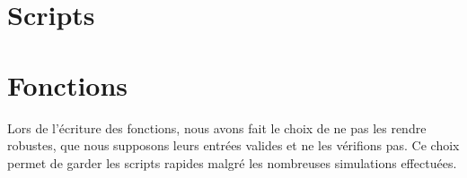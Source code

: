 \documentclass[a4paper, 12pt]{article}
\begin{document}
	\section{Scripts}
	
	
	
	
	
	\newpage
	\section{Fonctions}
	Lors de l'écriture des fonctions, nous avons fait le choix de ne pas les rendre robustes, \cad que nous supposons leurs entrées valides et ne les vérifions pas. Ce choix permet de garder les scripts rapides malgré les nombreuses simulations effectuées.
	
	
	
\end{document}
